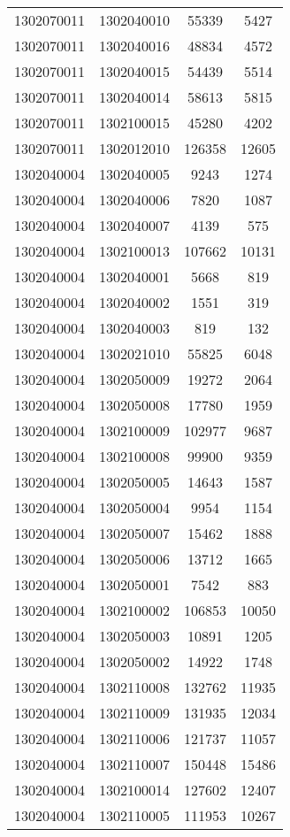 \begin{longtable}[h]{llcc}
		1302070011 & 1302040010 & 55339 & 5427\\
		1302070011 & 1302040016 & 48834 & 4572\\
		1302070011 & 1302040015 & 54439 & 5514\\
		1302070011 & 1302040014 & 58613 & 5815\\
		1302070011 & 1302100015 & 45280 & 4202\\
		1302070011 & 1302012010 & 126358 & 12605\\
		1302040004 & 1302040005 & 9243 & 1274\\
		1302040004 & 1302040006 & 7820 & 1087\\
		1302040004 & 1302040007 & 4139 & 575\\
		1302040004 & 1302100013 & 107662 & 10131\\
		1302040004 & 1302040001 & 5668 & 819\\
		1302040004 & 1302040002 & 1551 & 319\\
		1302040004 & 1302040003 & 819 & 132\\
		1302040004 & 1302021010 & 55825 & 6048\\
		1302040004 & 1302050009 & 19272 & 2064\\
		1302040004 & 1302050008 & 17780 & 1959\\
		1302040004 & 1302100009 & 102977 & 9687\\
		1302040004 & 1302100008 & 99900 & 9359\\
		1302040004 & 1302050005 & 14643 & 1587\\
		1302040004 & 1302050004 & 9954 & 1154\\
		1302040004 & 1302050007 & 15462 & 1888\\
		1302040004 & 1302050006 & 13712 & 1665\\
		1302040004 & 1302050001 & 7542 & 883\\
		1302040004 & 1302100002 & 106853 & 10050\\
		1302040004 & 1302050003 & 10891 & 1205\\
		1302040004 & 1302050002 & 14922 & 1748\\
		1302040004 & 1302110008 & 132762 & 11935\\
		1302040004 & 1302110009 & 131935 & 12034\\
		1302040004 & 1302110006 & 121737 & 11057\\
		1302040004 & 1302110007 & 150448 & 15486\\
		1302040004 & 1302100014 & 127602 & 12407\\
		1302040004 & 1302110005 & 111953 & 10267\\

\end{longtable}
